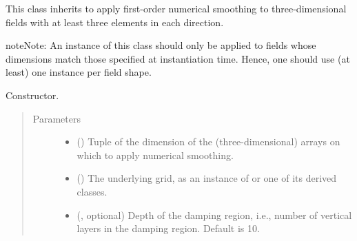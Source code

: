 \documentclass[letterpaper,10pt,english]{sphinxmanual}
\begin{document}
\begin{fulllineitems}
\label{\detokenize{api:dycore.horizontal_smoothing.HorizontalSmoothingFirstOrderXYZ}}
This class inherits {\hyperref[\detokenize{api:dycore.horizontal_smoothing.HorizontalSmoothing}]{}} to apply first-order numerical smoothing to
three-dimensional fields with at least three elements in each direction.

\begin{sphinxadmonition}{note}{Note:}
An instance of this class should only be applied to fields whose dimensions match those specified at instantiation time.
Hence, one should use (at least) one instance per field shape.
\end{sphinxadmonition}

\begin{fulllineitems}
\label{\detokenize{api:dycore.horizontal_smoothing.HorizontalSmoothingFirstOrderXYZ.__init__}}
Constructor.
\begin{quote}\begin{description}
\item[{Parameters}] \leavevmode\begin{itemize}
\item {} 
 () \textendash{} Tuple of the dimension of the (three-dimensional) arrays on which to apply numerical smoothing.

\item {} 
 () \textendash{} The underlying grid, as an instance of {\hyperref[\detokenize{api:grids.grid_xyz.GridXYZ}]{}} or one of its derived classes.

\item {} 
 (, optional) \textendash{} Depth of the damping region, i.e., number of vertical layers in the damping region. Default is 10.


\end{itemize}
\end{description}
\end{quote}
\end{fulllineitems}
\end{fulllineitems}
\end{document}
